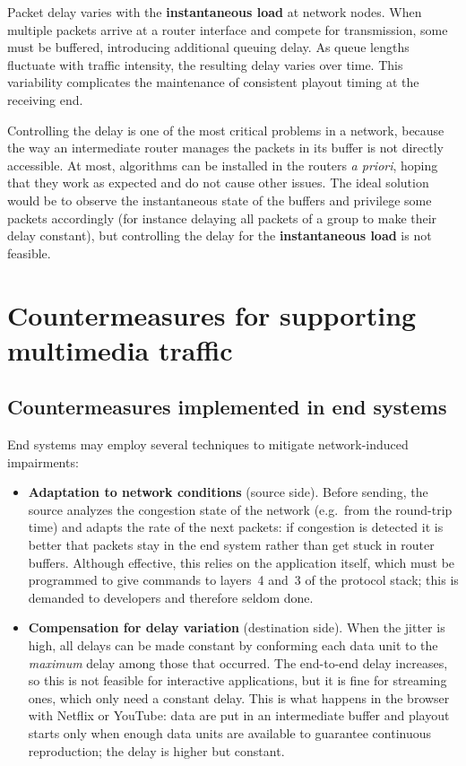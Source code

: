 Packet delay varies with the \textbf{instantaneous load} at network nodes. When multiple packets arrive at a router interface and compete for transmission, some must be buffered, introducing additional queuing delay. As queue lengths fluctuate with traffic intensity, the resulting delay varies over time. This variability complicates the maintenance of consistent playout timing at the receiving end.

\begin{center}
\end{center}

Controlling the delay is one of the most critical problems in a network, because the way an intermediate router manages the packets in its buffer is not directly accessible. At most, algorithms can be installed in the routers \emph{a priori}, hoping that they work as expected and do not cause other issues. The ideal solution would be to observe the instantaneous state of the buffers and privilege some packets accordingly (for instance delaying all packets of a group to make their delay constant), but controlling the delay for the \textbf{instantaneous load} is not feasible.

\section{Countermeasures for supporting multimedia traffic}

\subsection{Countermeasures implemented in end systems}

End systems may employ several techniques to mitigate network-induced impairments:

\begin{itemize}
\item \textbf{Adaptation to network conditions} (source side). Before sending, the source analyzes the congestion state of the network (e.g.\ from the round-trip time) and adapts the rate of the next packets: if congestion is detected it is better that packets stay in the end system rather than get stuck in router buffers. Although effective, this relies on the application itself, which must be programmed to give commands to layers~4 and~3 of the protocol stack; this is demanded to developers and therefore seldom done.
\item \textbf{Compensation for delay variation} (destination side). When the jitter is high, all delays can be made constant by conforming each data unit to the \emph{maximum} delay among those that occurred. The end-to-end delay increases, so this is not feasible for interactive applications, but it is fine for streaming ones, which only need a constant delay. This is what happens in the browser with Netflix or YouTube: data are put in an intermediate buffer and playout starts only when enough data units are available to guarantee continuous reproduction; the delay is higher but constant.
\end{itemize}

